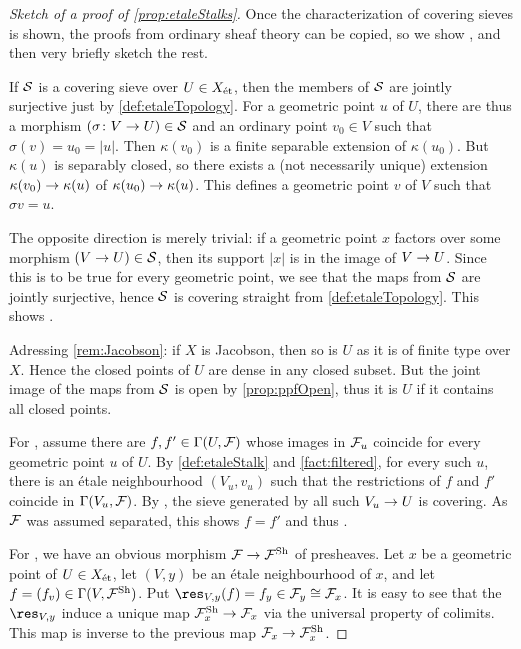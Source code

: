 \begin{proof}[Sketch of a proof of \cref{prop:etaleStalks}]
	Once the characterization of covering sieves is shown, the proofs from ordinary sheaf theory can be copied, so we show , and then very briefly sketch the rest.
	
	If $\mathcal{S}$ is a covering sieve over $U\in X_{\mathrm{\acute{e}t}}$, then the members of $\mathcal{S}$ are jointly surjective just by \cref{def:etaleTopology}. For a geometric point $u$ of $U$, there are thus a morphism $(\sigma\colon V\morphism U)\in\Ss$ and an ordinary point $v_0\in V$ such that $\sigma(v)=u_0=|u|$. Then $\kappa(v_0)$ is a finite separable extension of $\kappa(u_0)$. But $\kappa(u)$ is separably closed, so there exists a (not necessarily unique) extension $\kappa(v_0)\morphism \kappa(u)$ of $\kappa(u_0)\morphism \kappa(u)$. This defines a geometric point $v$ of $V$ such that $\sigma v=u$.
	
	The opposite direction is merely trivial: if a geometric point $x$ factors over some morphism $(V\morphism U)\in \Ss$, then its support $|x|$ is in the image of $V\morphism U$. Since this is to be true for every geometric point, we see that the maps from $\mathcal{S}$ are jointly surjective, hence $\mathcal{S}$ is covering straight from \cref{def:etaleTopology}. This shows .
	
	Adressing \cref{rem:Jacobson}: if $X$ is Jacobson, then so is $U$ as it is of finite type over $X$. Hence the closed points of $U$ are dense in any closed subset. But the joint image of the maps from $\mathcal{S}$ is open by \cref{prop:ppfOpen}, thus it is $U$ if it contains all closed points.
	
	For , assume there are $f,f'\in\operatorname{\Gamma}(U,\mathcal{F})$ whose images in $\mathcal{F}_u$ coincide for every geometric point $u$ of $U$. By \cref{def:etaleStalk} and \cref{fact:filtered}, for every such $u$, there is an étale neighbourhood $(V_u,v_u)$ such that the restrictions of $f$ and $f'$ coincide in $\operatorname{\Gamma}(V_u,\mathcal{F})$. By , the sieve generated by all such $V_u\morphism U$ is covering. As $\mathcal{F}$ was assumed separated, this shows $f=f'$ and thus .
	
	For , we have an obvious morphism $\Ff\morphism\Ff^\Sh$ of presheaves. Let $x$ be a geometric point of $U\in X_{\mathrm{\acute{e}t}}$, let $(V,y)$ be an étale neighbourhood of $x$, and let $f=(f_v)\in\operatorname{\Gamma}(V,\mathcal{F}^{\mathrm{Sh}})$. Put $\res_{V,y}(f)=f_y\in\Ff_y\cong \Ff_x$. It is easy to see that the $\res_{V,y}$ induce a unique map $\Ff_x^\Sh\morphism \Ff_x$ via the universal property of colimits. This map is inverse to the previous map $\Ff_x\morphism\Ff_x^\Sh$.
	

\end{proof}
